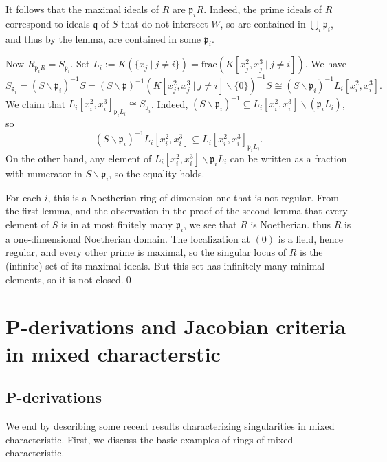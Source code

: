 \documentclass{amsart}[12pt]
\newcommand{\fp}{{\mathfrak p}}
\newcommand{\fq}{{\mathfrak q}}
\numberwithin{equation}{section}
\theoremstyle{plain} %
\theoremstyle{definition}
\theoremstyle{remark}
\begin{document}
It follows that the maximal ideals of $R$ are $\fp_i R$. Indeed, the prime ideals of $R$ correspond to ideals $\fq$ of $S$ that do not intersect $W$, so are contained in $\bigcup_i \fp_i$, and thus by the lemma, are contained in some $\fp_i$.

Now $R_{\fp_i R} = S_{\fp_i}$.
Set $L_i:=K(\{ x_j \ | \ j \neq i\}) = \mathrm{frac}( K[x_j^2, x_j^3 \ | \ j\neq i])$. We have 
\[ S_{\fp_i} = (S\smallsetminus \fp_i)^{-1} S = (S\smallsetminus \fp)^{-1} ( K[x_j^2,x_j^3 \ | \ j\neq i] \smallsetminus \{0\})^{-1} S \cong (S\smallsetminus \fp_i)^{-1} L_i[x_i^2, x_i^3].\] We claim that $L_i[x_i^2,x_i^3]_{\fp_i L_i}\cong S_{\fp_i}$. Indeed, $(S\smallsetminus \fp_i)^{-1} \subseteq L_i[x_i^2,x_i^3]\smallsetminus {(\fp_i L_i)}$, so 
\[(S\smallsetminus \fp_i)^{-1} L_i[x_i^2, x_i^3] \subseteq L_i[x_i^2,x_i^3]_{\fp_i L_i}.\] 
On the other hand, any element of $L_i[x_i^2,x_i^3]\smallsetminus {\fp_i L_i}$ can be written as a fraction with numerator in $S\smallsetminus \fp_i$, so the equality holds.


For each $i$, this is a Noetherian ring of dimension one that is not regular.  From the first lemma, and the observation in the proof of the second lemma that every element of $S$ is in at most finitely many $\fp_i$, we see that $R$ is Noetherian. thus $R$ is a one-dimensional Noetherian domain. The localization at $(0)$ is a field, hence regular, and every other prime is maximal, so the singular locus of $R$ is the (infinite) set of its maximal ideals. But this set has infinitely many minimal elements, so it is not closed.\qed

\section{P-derivations and Jacobian criteria in mixed characterstic}

\subsection{P-derivations}

We end by describing some recent results characterizing singularities in mixed characteristic. First, we discuss the basic examples of rings of mixed characteristic.
\end{document}
